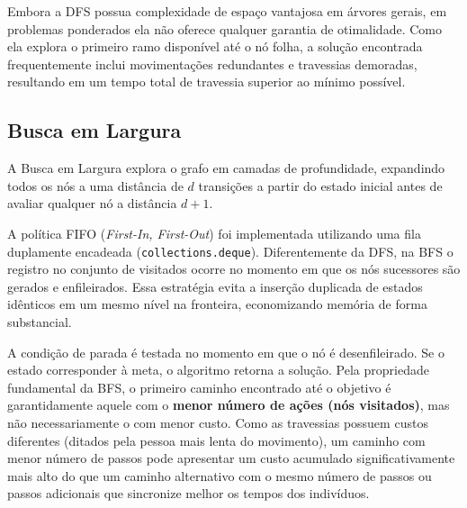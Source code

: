 Embora a DFS possua complexidade de espaço vantajosa em árvores gerais, em problemas
ponderados ela não oferece qualquer garantia de otimalidade. Como ela explora o
primeiro ramo disponível até o nó folha, a solução encontrada frequentemente inclui
movimentações redundantes e travessias demoradas, resultando em um tempo total de
travessia superior ao mínimo possível.

\subsection{Busca em Largura}
\label{subsec:bfs}

A Busca em Largura explora o grafo em camadas de profundidade, expandindo
todos os nós a uma distância de $d$ transições a partir do estado inicial antes de
avaliar qualquer nó a distância $d+1$.

A política FIFO (\textit{First-In, First-Out}) foi implementada utilizando uma fila
duplamente encadeada (\texttt{collections.deque}). Diferentemente da DFS, na BFS o
registro no conjunto de visitados ocorre no momento em que os nós sucessores são gerados
e enfileirados. Essa estratégia evita a inserção duplicada de estados idênticos em um
mesmo nível na fronteira, economizando memória de forma substancial.

A condição de parada é testada no momento em que o nó é desenfileirado. Se o estado
corresponder à meta, o algoritmo retorna a solução. Pela propriedade fundamental da BFS,
o primeiro caminho encontrado até o objetivo é garantidamente aquele com o
\textbf{menor número de ações (nós visitados)}, mas não necessariamente o com menor custo.
Como as travessias possuem custos diferentes (ditados pela pessoa
mais lenta do movimento), um caminho com menor número de passos pode apresentar um custo
acumulado significativamente mais alto do que um caminho alternativo com o mesmo número
de passos ou passos adicionais que sincronize melhor os tempos dos indivíduos.
